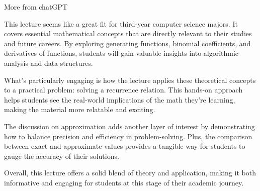 \documentclass[portrait,fleqn,12pt]{beamer}
\begin{document}
\begin{frame}{More from chatGPT} 

This lecture seems like a great fit for third-year computer science majors. It covers essential mathematical concepts that are directly relevant to their studies and future careers. By exploring generating functions, binomial coefficients, and derivatives of functions, students will gain valuable insights into algorithmic analysis and data structures.

What's particularly engaging is how the lecture applies these theoretical concepts to a practical problem: solving a recurrence relation. This hands-on approach helps students see the real-world implications of the math they're learning, making the material more relatable and exciting.

The discussion on approximation adds another layer of interest by demonstrating how to balance precision and efficiency in problem-solving. Plus, the comparison between exact and approximate values provides a tangible way for students to gauge the accuracy of their solutions.

Overall, this lecture offers a solid blend of theory and application, making it both informative and engaging for students at this stage of their academic journey.

\end{frame}
\end{document}
